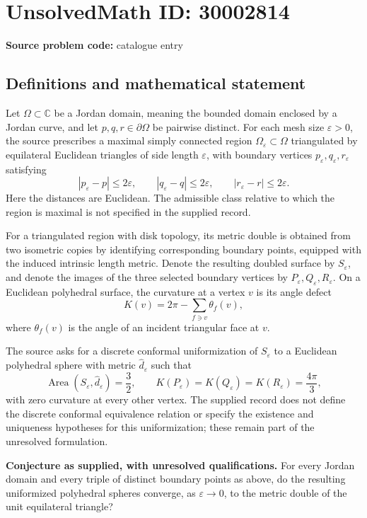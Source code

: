 \documentclass[11pt]{article}
\newcommand{\C}{\mathbb{C}}
\begin{document}
\section*{UnsolvedMath ID: 30002814}
\textbf{Source problem code:} catalogue entry
\subsection{Definitions and mathematical statement}
Let \(\Omega\subset\C\) be a Jordan domain, meaning the bounded domain enclosed by a Jordan curve, and let \(p,q,r\in\partial\Omega\) be pairwise distinct. For each mesh size \(\varepsilon>0\), the source prescribes a maximal simply connected region \(\Omega_\varepsilon\subset\Omega\) triangulated by equilateral Euclidean triangles of side length \(\varepsilon\), with boundary vertices \(p_\varepsilon,q_\varepsilon,r_\varepsilon\) satisfying
\[
 |p_\varepsilon-p|\leq 2\varepsilon,\qquad
 |q_\varepsilon-q|\leq 2\varepsilon,\qquad
 |r_\varepsilon-r|\leq 2\varepsilon.
\]
Here the distances are Euclidean. The admissible class relative to which the region is maximal is not specified in the supplied record.

For a triangulated region with disk topology, its metric double is obtained from two isometric copies by identifying corresponding boundary points, equipped with the induced intrinsic length metric. Denote the resulting doubled surface by \(S_\varepsilon\), and denote the images of the three selected boundary vertices by \(P_\varepsilon,Q_\varepsilon,R_\varepsilon\). On a Euclidean polyhedral surface, the curvature at a vertex \(v\) is its angle defect
\[
 K(v)=2\pi-\sum_{f\ni v}\theta_f(v),
\]
where \(\theta_f(v)\) is the angle of an incident triangular face at \(v\).

The source asks for a discrete conformal uniformization of \(S_\varepsilon\) to a Euclidean polyhedral sphere with metric \(\widehat d_\varepsilon\) such that
\[
 \operatorname{Area}(S_\varepsilon,\widehat d_\varepsilon)=\frac32,
 \qquad
 K(P_\varepsilon)=K(Q_\varepsilon)=K(R_\varepsilon)=\frac{4\pi}{3},
\]
with zero curvature at every other vertex. The supplied record does not define the discrete conformal equivalence relation or specify the existence and uniqueness hypotheses for this uniformization; these remain part of the unresolved formulation.

\textbf{Conjecture as supplied, with unresolved qualifications.} For every Jordan domain and every triple of distinct boundary points as above, do the resulting uniformized polyhedral spheres converge, as \(\varepsilon\to0\), to the metric double of the unit equilateral triangle?
\end{document}
